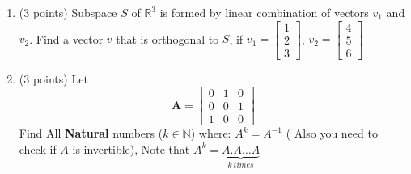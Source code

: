 \documentclass[]{exam}
\begin{document}
\begin{enumerate}
\item (3 points) Subspace $S$ of $\mathbb{R}^3$ is formed by linear combination of vectors $v_1$ and $v_2$. Find a vector $v$ that is orthogonal to $S$, if $v_1 = \begin{bmatrix}1 \\ 2\\ 3\end{bmatrix}$, $v_2 = \begin{bmatrix}4 \\ 5\\ 6\end{bmatrix}$

\item (3 points) Let \begin{equation}
    \mathbf{A}=\begin{bmatrix}
       0  & 1 & 0 \\
       0  & 0 & 1 \\
       1  & 0 & 0 
    \end{bmatrix}
    \end{equation}
Find All \textbf{Natural} numbers ($k\in \mathbb{N}$) where: $A^k=A^{-1}$ ( Also you need to check if $A$ is invertible), Note that $A^k=\underbrace{A.A \dots A}_{k \ times} $











\end{enumerate}
\end{document}
